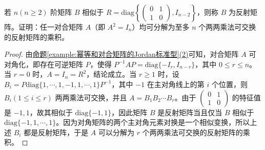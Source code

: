 \documentclass[../../main.tex]{subfiles}
\begin{document}
\begin{example}
若 $n(n\geq 2)$ 阶矩阵 $B$ 相似于 $R = \mathrm{diag}\left\{\begin{pmatrix}0 & 1 \\ 1 & 0\end{pmatrix},I_{n - 2}\right\}$，则称 $B$ 为反射矩阵。证明：任一对合矩阵 $A$（即 $A^2 = I_n$）均可分解为至多 $n$ 个两两乘法可交换的反射矩阵的乘积。
\end{example}
\begin{proof}
由\hyperref[example:幂等和对合矩阵的Jordan标准型]{命题\ref{example:幂等和对合矩阵的Jordan标准型}(2)}可知，对合矩阵 $A$ 可对角化，即存在可逆矩阵 $P$，使得 $P^{-1}AP=\mathrm{diag}\{-I_r,I_{n - r}\}$，其中 $0\leq r\leq n$。当 $r = 0$ 时，$A = I_n = R^2$，结论成立。当 $r\geq 1$ 时，设 $B_i = P\mathrm{diag}\{1,\cdots,1,-1,1,\cdots,1\}P^{-1}$，其中 $-1$ 在主对角线上的第 $i$ 个位置，则 $B_i(1\leq i\leq r)$ 两两乘法可交换，并且 $A = B_1B_2\cdots B_r$。由于 $\begin{pmatrix}0 & 1 \\ 1 & 0\end{pmatrix}$ 的特征值是 $-1,1$，故其相似于 $\mathrm{diag}\{-1,1\}$，因此矩阵 $B$ 是反射矩阵当且仅当 $B$ 相似于 $\mathrm{diag}\{-1,1,\cdots,1\}$。因为对角矩阵的两个主对角元素对换是一个相似变换，所以上述 $B_i$ 都是反射矩阵，于是 $A$ 可以分解为 $r$ 个两两乘法可交换的反射矩阵的乘积。
\end{proof}
\end{document}
